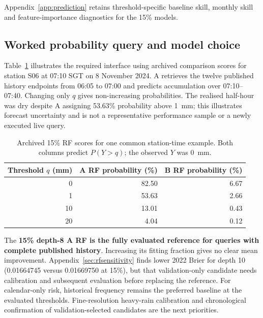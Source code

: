 Appendix~\ref{app:prediction} retains threshold-specific baseline skill, monthly skill and feature-importance diagnostics for the 15\% models.

\FloatBarrier
\subsection{Worked probability query and model choice}
Table~\ref{tab:workedquery} illustrates the required interface using archived comparison scores for station S06 at 07:10 SGT on 8 November 2024. A retrieves the twelve published history endpoints from 06:05 to 07:00 and predicts accumulation over 07:10--07:40. Changing only $q$ gives non-increasing probabilities. The realised half-hour was dry despite A assigning 53.63\% probability above 1~mm; this illustrates forecast uncertainty and is not a representative performance sample or a newly executed live query.
\begin{table}[htbp]\centering\small
\begin{tabular}{rrr}\toprule
Threshold $q$ (mm) & A RF probability (\%) & B RF probability (\%)\\\midrule
0 & 82.50 & 6.67 \\
1 & 53.63 & 2.66 \\
10 & 13.01 & 0.43 \\
20 & 4.04 & 0.12 \\
\bottomrule\end{tabular}
\caption{Archived 15\% RF scores for one common station-time example. Both columns predict $P(Y>q)$; the observed $Y$ was 0~mm.}\label{tab:workedquery}
\end{table}

The \textbf{15\% depth-8 A RF is the fully evaluated reference for queries with complete published history}. Increasing its fitting fraction gives no clear mean improvement. Appendix~\ref{sec:rfsensitivity} finds lower 2022 Brier for depth 10 (0.01664745 versus 0.01669750 at 15\%), but that validation-only candidate needs calibration and subsequent evaluation before replacing the reference. For calendar-only risk, historical frequency remains the preferred baseline at the evaluated thresholds. Fine-resolution heavy-rain calibration and chronological confirmation of validation-selected candidates are the next priorities.
